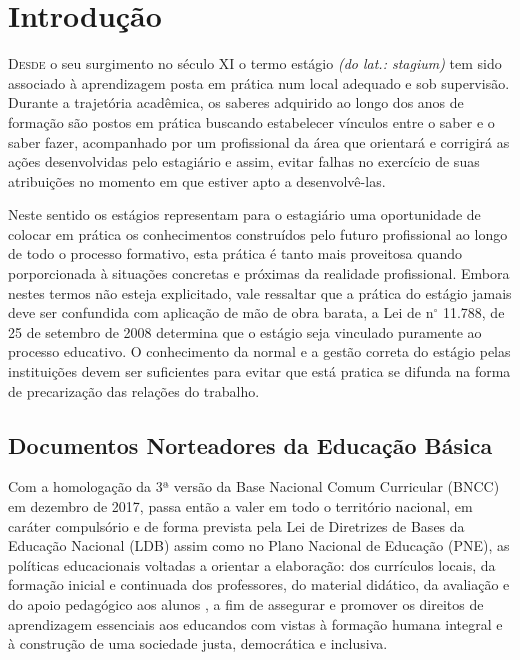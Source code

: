 
\chapter{Introdução}
\lettrine{D}{esde} o seu surgimento no século XI o termo estágio \emph{(do lat.: stagium)} tem sido associado à aprendizagem posta em prática num local adequado e sob supervisão. Durante a trajetória acadêmica, os saberes adquirido ao longo dos anos de formação são postos em prática buscando estabelecer vínculos entre o saber e o saber fazer, acompanhado por um profissional da área que orientará e corrigirá as ações desenvolvidas pelo estagiário e assim, evitar falhas no exercício de suas atribuições no momento em que estiver apto a desenvolvê-las.

Neste sentido os estágios representam para o estagiário uma oportunidade de colocar em prática os conhecimentos construídos pelo futuro profissional ao longo de todo o processo formativo, esta prática é tanto mais proveitosa quando porporcionada à situações concretas e próximas da realidade profissional. Embora nestes termos não esteja explicitado, vale ressaltar que a prática do estágio jamais deve ser confundida com aplicação de mão de obra barata, a Lei de n$^\circ$ 11.788, de 25 de setembro de 2008 determina que o estágio seja vinculado puramente ao processo educativo. O conhecimento da normal e a gestão correta do estágio pelas instituições devem ser suficientes para evitar que está pratica se difunda na forma de precarização das relações do trabalho.

\section{Documentos Norteadores da Educação Básica}
Com a homologação da 3ª versão da Base Nacional Comum Curricular (BNCC) em dezembro de 2017, passa então a valer em todo o território nacional, em caráter compulsório e de forma prevista pela Lei de Diretrizes de Bases da Educação Nacional (LDB) assim como no Plano Nacional de Educação (PNE), as políticas educacionais voltadas a orientar a elaboração: dos currículos locais, da formação inicial e continuada dos professores, do material didático, da avaliação e do apoio pedagógico aos alunos \cite{BRASIL:2017}, a fim de assegurar e promover os direitos de aprendizagem essenciais aos educandos com vistas à formação humana integral e à construção de uma sociedade justa, democrática e inclusiva.

